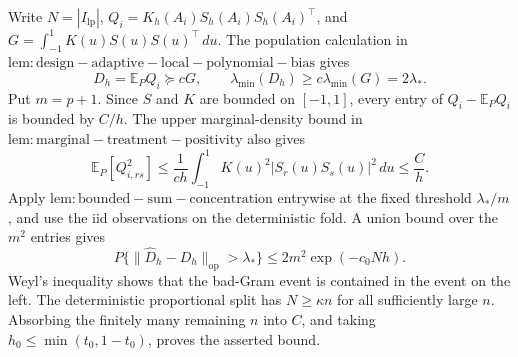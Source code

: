 Write \(N=|I_{\mathrm{lp}}|\), \(Q_i=K_h(A_i)S_h(A_i)S_h(A_i)^\top\), and \(G=\int_{-1}^1K(u)S(u)S(u)^\top\,du\).  The population calculation in \(\mathrm{lem:design-adaptive-local-polynomial-bias}\) gives
\[
D_h=\mathbb E_PQ_i\succeq cG,
\qquad
\lambda_{\min}(D_h)\ge c\lambda_{\min}(G)=2\lambda_*.
\]
Put \(m=p+1\).  Since \(S\) and \(K\) are bounded on \([-1,1]\), every entry of \(Q_i-\mathbb E_PQ_i\) is bounded by \(C/h\).  The upper marginal-density bound in \(\mathrm{lem:marginal-treatment-positivity}\) also gives
\[
\mathbb E_P[Q_{i,rs}^2]
\le \frac{1}{ch}\int_{-1}^1K(u)^2|S_r(u)S_s(u)|^2\,du
\le \frac Ch.
\]
Apply \(\mathrm{lem:bounded-sum-concentration}\) entrywise at the fixed threshold \(\lambda_*/m\), and use the iid observations on the deterministic fold.  A union bound over the \(m^2\) entries gives
\[
P\{\|\widehat D_h-D_h\|_{\mathrm{op}}>\lambda_*\}
\le2m^2\exp(-c_0Nh).
\]
Weyl's inequality shows that the bad-Gram event is contained in the event on the left.  The deterministic proportional split has \(N\ge\kappa n\) for all sufficiently large \(n\).  Absorbing the finitely many remaining \(n\) into \(C\), and taking \(h_0\le\min(t_0,1-t_0)\), proves the asserted bound.